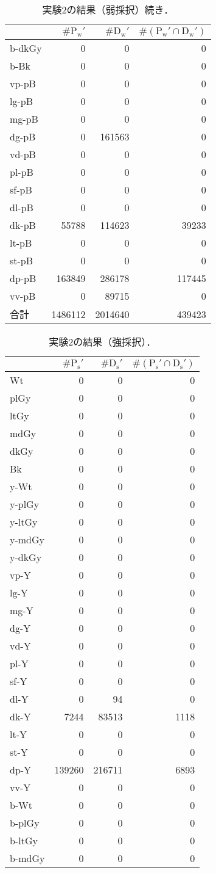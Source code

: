 \documentclass[uplatex,paper=a4,fontsize=4.0truemm,jafontsize=4.0truemm,head_space=30.0truemm,foot_space=30.0truemm,baselineskip=8.0truemm,line_length=40zw,gutter=25.0truemm,oneside,openany,fleqn,hanging_panctuation,open_bracket_pos=nibu_tentsuki,dvipdfmx,jis2004,book,titlepage]{jlreq}
\theoremstyle{mystyle}
\newcommand{\zwspace}{\hspace{1zw}\relax}
\newcommand{\captiondot}[1]{\caption{#1．}}
\newcommand{\tableinput}[4]{\begin{table}[btp]\centering\captiondot{#3}\label{tab:#4}\begin{tabular}{#1}#2\end{tabular}\end{table}}
\newcommand{\parentheses}[1]{\left(#1\right)}
\begin{document}
				\tableinput{l|rrr}{ & \(\#\textrm{P}_\textrm{w}'\) & \(\#\textrm{D}_\textrm{w}'\) & \(\#\parentheses{\textrm{P}_\textrm{w}'\cap\textrm{D}_\textrm{w}'}\) \\ \hline
					b-dkGy & 0 & 0 & 0 \\
					b-Bk & 0 & 0 & 0 \\
					vp-pB & 0 & 0 & 0 \\
					lg-pB & 0 & 0 & 0 \\
					mg-pB & 0 & 0 & 0 \\
					dg-pB & 0 & 161563 & 0 \\
					vd-pB & 0 & 0 & 0 \\
					pl-pB & 0 & 0 & 0 \\
					sf-pB & 0 & 0 & 0 \\
					dl-pB & 0 & 0 & 0 \\
					dk-pB & 55788 & 114623 & 39233 \\
					lt-pB & 0 & 0 & 0 \\
					st-pB & 0 & 0 & 0 \\
					dp-pB & 163849 & 286178 & 117445 \\
					vv-pB & 0 & 89715 & 0 \\ \hline
					合計 & 1486112 & 2014640 & 439423}{実験2の結果（弱採択）\zwspace 続き}{result25}
				\clearpage
				\tableinput{l|rrr}{ & \(\#\textrm{P}_\textrm{s}'\) & \(\#\textrm{D}_\textrm{s}'\) & \(\#\parentheses{\textrm{P}_\textrm{s}'\cap\textrm{D}_\textrm{s}'}\) \\ \hline
					Wt & 0 & 0 & 0 \\
					plGy & 0 & 0 & 0 \\
					ltGy & 0 & 0 & 0 \\
					mdGy & 0 & 0 & 0 \\
					dkGy & 0 & 0 & 0 \\
					Bk & 0 & 0 & 0 \\
					y-Wt & 0 & 0 & 0 \\
					y-plGy & 0 & 0 & 0 \\
					y-ltGy & 0 & 0 & 0 \\
					y-mdGy & 0 & 0 & 0 \\
					y-dkGy & 0 & 0 & 0 \\
					vp-Y & 0 & 0 & 0 \\
					lg-Y & 0 & 0 & 0 \\
					mg-Y & 0 & 0 & 0 \\
					dg-Y & 0 & 0 & 0 \\
					vd-Y & 0 & 0 & 0 \\
					pl-Y & 0 & 0 & 0 \\
					sf-Y & 0 & 0 & 0 \\
					dl-Y & 0 & 94 & 0 \\
					dk-Y & 7244 & 83513 & 1118 \\
					lt-Y & 0 & 0 & 0 \\
					st-Y & 0 & 0 & 0 \\
					dp-Y & 139260 & 216711 & 6893 \\
					vv-Y & 0 & 0 & 0 \\
					b-Wt & 0 & 0 & 0 \\
					b-plGy & 0 & 0 & 0 \\
					b-ltGy & 0 & 0 & 0 \\
					b-mdGy & 0 & 0 & 0}{実験2の結果（強採択）}{result23}
\end{document}
